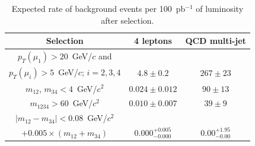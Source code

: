 \documentclass[aps,prl,twocolumn,nofootinbib,superscriptaddress]{revtex4}
\begin{document}
\begin{table}[t]
\caption{Expected rate of background events per 100~pb$^{-1}$ of
  luminosity after selection. \label{bckgr_cuts_number_reco_level}}
\begin{center}
\renewcommand{\arraystretch}{1.4}
\begin{tabular}{c|c|c}
\hline\hline
Selection & 4 leptons & QCD multi-jet \\ 
\hline
$p_T (\mu_1) > 20$~GeV/$c$ and       &                           &                        \\
$p_T (\mu_i) > 5$~GeV/$c$; $i=2,3,4$ &               $4.8\pm0.2$ &             $267\pm23$ \\
\hline
$m_{12}$, $m_{34} < 4$~GeV/$c^2$     &           $0.024\pm0.012$ &              $90\pm13$ \\
$m_{1234} > 60$~GeV/$c^2$            &           $0.010\pm0.007$ &               $39\pm9$ \\
$|m_{12} - m_{34}| < 0.08$~GeV/$c^2$ &                           &                        \\
$+0.005 \times (m_{12} + m_{34})$    & $0.000^{+0.005}_{-0.000}$ & $0.00^{+1.95}_{-0.00}$ \\
\hline\hline
\end{tabular}
\end{center}
\end{table}
\end{document}
